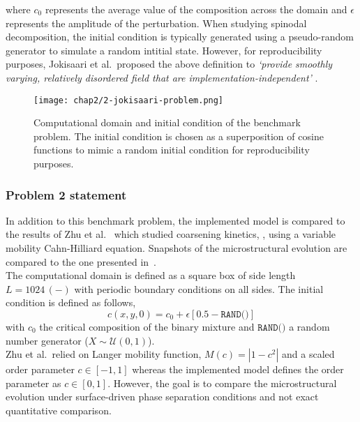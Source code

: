     where $c_0$ represents the average value of the composition across the domain and $\epsilon$ represents the amplitude of the perturbation. When studying spinodal decomposition, the initial condition is typically generated using a pseudo-random generator to simulate a random intitial state. However, for reproducibility purposes, Jokisaari et al.~proposed the above definition to \textit{`provide smoothly varying, relatively disordered field that are implementation-independent'} \cite{JokisaariVoorheesGuyerWarrenHeinonen2017}.
    \begin{figure}[H]
        \centering
        \texttt{[image: chap2/2-jokisaari-problem.png]}
        \caption{Computational domain and initial condition of the benchmark problem. The initial condition is chosen as a superposition of cosine functions to mimic a random initial condition for reproducibility purposes.}
        \label{fig:2-jokisaari-problem}
    \end{figure}
    \subsubsection{Problem 2 statement}
    In addition to this benchmark problem, the implemented model is compared to the results of Zhu et al.\ \cite{ZhuChenShenTikare1999} which studied coarsening kinetics, , using a variable mobility Cahn-Hilliard equation. Snapshots of the microstructural evolution are compared to the one presented in\ \cite{ZhuChenShenTikare1999}.\\
    The computational domain is defined as a square box of side length $L=1024\,(-)$ with periodic boundary conditions on all sides. The initial condition is defined as follows,
    \begin{equation}
        c(x, y, 0) = c_0 + \epsilon \left[ 0.5 - \texttt{RAND()} \right]
    \end{equation}
    with $c_0$ the critical composition of the binary mixture and $\texttt{RAND()}$ a random number generator ($X\sim \mathcal{U}(0, 1)$).\\
    Zhu et al.\ relied on Langer \cite{Langer1975} mobility function, $M(c)=|1-c^2|$ and a scaled order parameter $c\in\left[-1,1\right]$ whereas the implemented model defines the order parameter as $c\in\left[0,1\right]$. However, the goal is to compare the microstructural evolution under surface-driven phase separation conditions and not exact quantitative comparison.
